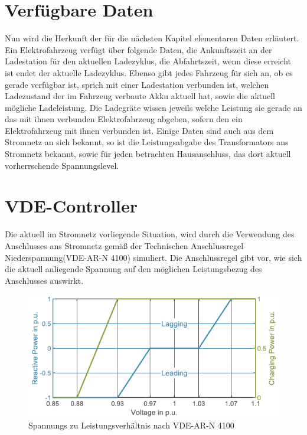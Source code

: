 \section{Verfügbare Daten}
\label{cap:background_sec:setting}
Nun wird die Herkunft der für die nächsten Kapitel elementaren Daten erläutert. Ein Elektrofahrzeug verfügt über folgende Daten, die Ankunftszeit an der Ladestation für den aktuellen Ladezyklus, die Abfahrtszeit, wenn diese erreicht ist endet der aktuelle Ladezyklus. Ebenso gibt jedes Fahrzeug für sich an, ob es gerade verfügbar ist, sprich mit einer Ladestation verbunden ist, welchen Ladezustand der im Fahrzeug verbaute Akku aktuell hat, sowie die aktuell mögliche Ladeleistung. Die Ladegräte wissen jeweils welche Leistung sie gerade an das mit ihnen verbunden Elektrofahrzeug abgeben, sofern den ein Elektrofahrzeug mit ihnen verbunden ist. Einige Daten sind auch aus dem Stromnetz an sich bekannt, so ist die Leistungsabgabe des Transformators ans Stromnetz bekannt, sowie für jeden betrachten Hausanschluss, das dort aktuell vorherrschende Spannungslevel.

\section{VDE-Controller}
\label{cap:background_sec:pureVDE}
Die aktuell im Stromnetz vorliegende Situation, wird durch die Verwendung des Anschlusses ans Stromnetz gemäß der Technischen Anschlussregel Niederspannung(VDE-AR-N 4100) simuliert. Die Anschlussregel gibt vor, wie sich die aktuell anliegende Spannung auf den möglichen Leistungsbezug des Anschlusses auswirkt. \\
\begin{figure}[h!]
	\includegraphics[width=\linewidth]{img/VDEGraph.png}
	\caption{Spannungs zu Leistungsverhältnis nach VDE-AR-N 4100}
	\label{Abb_VDEController}
\end{figure}

